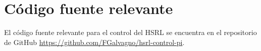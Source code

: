 \chapter{C\'odigo fuente relevante}
\label{anexo:codigo}

El código fuente relevante para el control del HSRL se encuentra en el repositorio de GitHub \url{https://github.com/FGalvagno/hsrl-control-pi}. \cite{repo}